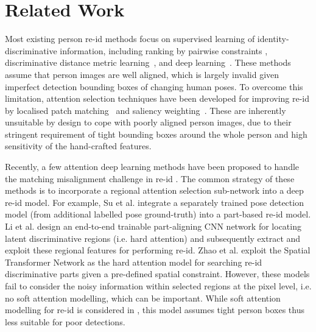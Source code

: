 \documentclass[10pt,twocolumn,letterpaper]{article}
\begin{document}
\section{Related Work}

Most existing person re-id methods
focus on supervised learning of identity-discriminative information,
including ranking by pairwise constraints
\cite{Anton_2015_CoRR,wang2016pami},
discriminative distance metric learning~\cite{KISSME_CVPR12,
	PRD_PAMI13,xiong2014person,liao2015person,zhang2016learning,chen2017person},
and deep learning~\cite{qian2017multi,
	li2014deepreid,chen2016multi,xiao2016learning,wangjoint,li2017person}.
These methods assume that person images are well aligned,
which is largely invalid given imperfect detection bounding boxes of
changing human poses.
To overcome this limitation, 
attention selection techniques have been developed
for improving re-id by localised patch matching~\cite{shen2015person,zheng2015partial} and
saliency weighting~\cite{hanxiao2014GTS,SalienceReId_CVPR13}.
These are inherently unsuitable by design to 
cope with poorly aligned person images, due to their
stringent requirement of tight bounding boxes around the whole person
and high sensitivity of the hand-crafted features.


Recently, a few attention deep learning methods 
have been proposed to handle the matching misalignment challenge
in re-id
\cite{li2017learning,zhao2017deeply,su2017pose, lan2017deep}. 
The common strategy of these methods is to incorporate a regional attention selection sub-network into 
a deep re-id model.
For example, Su et al. \cite{su2017pose} integrate a separately trained pose detection model 
(from additional labelled pose ground-truth) into a part-based re-id model.
Li et al. \cite{li2017learning} design an end-to-end trainable part-aligning CNN network for 
locating latent discriminative regions (i.e. hard attention) and subsequently
extract and exploit these regional features for performing re-id.
Zhao et al. \cite{zhao2017deeply} exploit
the Spatial Transformer Network \cite{jaderberg2015spatial}
as the hard attention model for searching re-id discriminative parts 
given a pre-defined spatial constraint. 
However, these models fail to consider the noisy information within
selected regions at the pixel level, i.e. no soft attention modelling,
which can be important.
While soft attention modelling for re-id is considered in
\cite{liu2017hydraplus}, this model assumes tight person boxes thus
less suitable for poor detections. 
\end{document}
